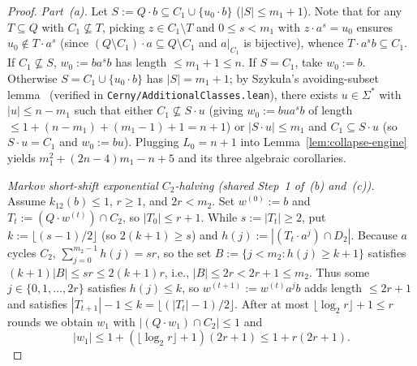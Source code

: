 \documentclass[11pt,a4paper]{article}
\theoremstyle{definition}
\theoremstyle{remark}
\begin{document}
\begin{proof}
\emph{Part~(a).} Let $S := Q \cdot b \subseteq C_1 \cup \{u_0 \cdot b\}$ ($|S| \le m_1 + 1$). Note that for any $T \subseteq Q$ with $C_1 \not\subseteq T$, picking $z \in C_1 \setminus T$ and $0 \le s < m_1$ with $z \cdot a^s = u_0$ ensures $u_0 \notin T \cdot a^s$ (since $(Q \setminus C_1)\cdot a \subseteq Q \setminus C_1$ and $a|_{C_1}$ is bijective), whence $T \cdot a^s b \subseteq C_1$. If $C_1 \not\subseteq S$, $w_0 := b a^s b$ has length $\le m_1 + 1 \le n$. If $S = C_1$, take $w_0 := b$. Otherwise $S = C_1 \cup \{u_0 \cdot b\}$ has $|S| = m_1 + 1$; by Szyku\l a's avoiding-subset lemma~\cite{Szykula2018} (verified in \texttt{Cerny/AdditionalClasses.lean}), there exists $u \in \Sigma^*$ with $|u| \le n - m_1$ such that either $C_1 \not\subseteq S \cdot u$ (giving $w_0 := b u a^s b$ of length $\le 1 + (n - m_1) + (m_1 - 1) + 1 = n + 1$) or $|S \cdot u| \le m_1$ and $C_1 \subseteq S \cdot u$ (so $S \cdot u = C_1$ and $w_0 := b u$). Plugging $L_0 = n + 1$ into Lemma~\ref{lem:collapse-engine} yields $m_1^2 + (2n - 4)m_1 - n + 5$ and its three algebraic corollaries.

\emph{Markov short-shift exponential $C_2$-halving (shared Step~1 of~(b) and~(c)).} Assume $k_{12}(b) \le 1$, $r \ge 1$, and $2r < m_2$. Set $w^{(0)} := b$ and $T_t := (Q \cdot w^{(t)}) \cap C_2$, so $|T_0| \le r + 1$. While $s := |T_t| \ge 2$, put $k := \lfloor (s - 1)/2 \rfloor$ (so $2(k+1) \ge s$) and $h(j) := |(T_t \cdot a^j) \cap D_2|$. Because $a$ cycles $C_2$, $\sum_{j=0}^{m_2-1} h(j) = s r$, so the set $B := \{j < m_2 : h(j) \ge k + 1\}$ satisfies $(k+1)|B| \le s r \le 2(k+1)r$, i.e., $|B| \le 2r < 2r + 1 \le m_2$. Thus some $j \in \{0, 1, \dots, 2r\}$ satisfies $h(j) \le k$, so $w^{(t+1)} := w^{(t)} a^j b$ adds length $\le 2r + 1$ and satisfies $|T_{t+1}| - 1 \le k = \lfloor (|T_t| - 1)/2 \rfloor$. After at most $\lfloor\log_2 r\rfloor + 1 \le r$ rounds we obtain $w_1$ with $|(Q \cdot w_1) \cap C_2| \le 1$ and
\[
  |w_1| \le 1 + (\lfloor \log_2 r \rfloor + 1)(2r + 1) \le 1 + r(2r + 1).
\]


\end{proof}
\end{document}

